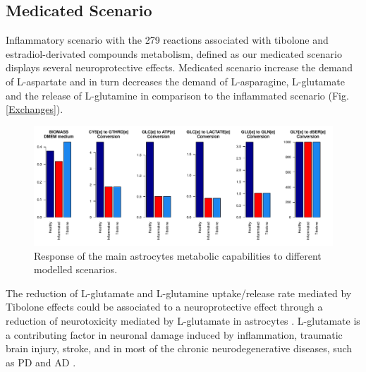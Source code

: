 \subsection*{Medicated Scenario}
Inflammatory scenario with the 279 reactions associated with tibolone and estradiol-derivated compounds metabolism, defined as our medicated scenario displays several neuroprotective effects. Medicated scenario increase the demand of L-aspartate and in turn decreases the demand of L-asparagine, L-glutamate and the release of L-glutamine in comparison to the inflammated scenario (Fig. \ref{Exchanges}).

\begin{figure}[h]
\begin{center}
\includegraphics[width=\textwidth]{neuroprotective/Effects}
\end{center}
\caption{Response of the main astrocytes metabolic capabilities to different modelled scenarios.}
\label{Effects}
\end{figure}

The reduction of L-glutamate and L-glutamine uptake/release rate mediated by Tibolone effects could be associated to a neuroprotective effect through a reduction of neurotoxicity mediated by L-glutamate in astrocytes \cite{Petrelli2016}. L-glutamate is a contributing factor in neuronal damage induced by inflammation, traumatic brain injury, stroke, and in most of the chronic neurodegenerative diseases, such as PD and AD \cite{Ahlemeyer2002}.

